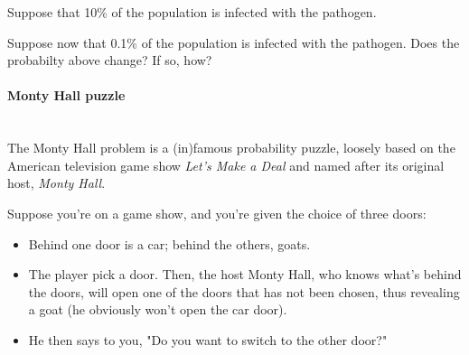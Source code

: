 \documentclass[a4paper,11pt]{exam}
\newcounter{ct}
\newcommand{\myparagraph}[1]{\paragraph{#1}\mbox{}\\}
\begin{document}
\begin{questions}
    \question Suppose that 10\% of the population is infected with the pathogen.
    \question Suppose now that 0.1\% of the population is infected with the pathogen. Does the probabilty above change? If so, how?
\end{questions}

\myparagraph{Monty Hall puzzle} The Monty Hall problem is a (in)famous probability puzzle, loosely based on the American television game show \textit{Let's Make a Deal} and named after its original host, \textit{Monty Hall}.

Suppose you're on a game show, and you're given the choice of three doors:
\begin{itemize}
    \item Behind one door is a car; behind the others, goats.
    \item The player pick a door. Then, the host Monty Hall, who knows what's behind the doors, will open one of the doors that has not been chosen, thus revealing a goat (he obviously won't open the car door).
    \item He then says to you, "Do you want to switch to the other door?"
\end{itemize}
\begin{questions}
\end{questions}
\end{document}
